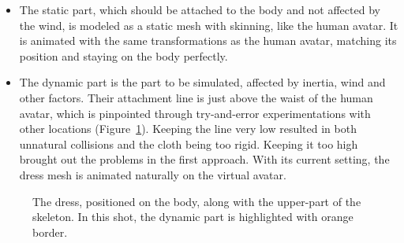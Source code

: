 \begin{itemize}
\item The static part, which should be attached to the body and not affected by the wind, is modeled as a static mesh with skinning, like the human avatar. It is animated with the same transformations as the human avatar, matching its position and staying on the body perfectly. 
\item The dynamic part is the part to be simulated, affected by inertia, wind and other factors. Their attachment line is just above the waist of the human avatar, which is pinpointed through try-and-error experimentations with other locations (Figure~\ref{fig:dress_and_body}). Keeping the line very low resulted in both unnatural collisions and the cloth being too rigid. Keeping it too high brought out the problems in the first approach. With its current setting, the dress mesh is animated naturally on the virtual avatar.
\end{itemize}

\begin{figure}[h]
\centerline{}
\caption{The dress, positioned on the body, along with the upper-part of the skeleton. In this shot, the dynamic part is highlighted with orange border.}
\label{fig:dress_and_body}
\end{figure}

